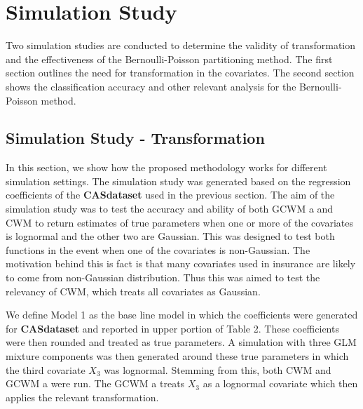 \documentclass[11pt,letterpaper]{article}
\numberwithin{equation}{section}
\numberwithin{equation}{section}
\numberwithin{equation}{section}
\begin{document}

\section{Simulation Study}

Two simulation studies are conducted to determine the validity of transformation and the effectiveness of the Bernoulli-Poisson partitioning method. The first section outlines the need for transformation in the covariates. The second section shows the classification accuracy and other relevant analysis for the Bernoulli-Poisson method.


\subsection{Simulation Study - Transformation}


In this section, we show how the proposed methodology works for different simulation settings. The simulation study was generated based on the regression coefficients of the \textbf{CASdataset} used in the previous section. The aim of the simulation study was to test the accuracy and ability of both GCWM a and CWM to return estimates of true parameters when one or more of the covariates is lognormal and the other two are Gaussian. This was designed to test both functions in the event when one of the covariates is non-Gaussian. The motivation behind this is fact is that many covariates used in insurance are likely to come from non-Gaussian distribution. Thus this was aimed to test the relevancy of CWM, which treats all covariates as Gaussian.

We define Model 1 as the base line model in which the coefficients were generated for \textbf{CASdataset} and reported in upper portion of Table 2. These coefficients were then rounded and treated as true parameters. A simulation with three GLM mixture components was then generated around these true parameters in which the third covariate $X_3$ was lognormal. Stemming from this, both CWM and  GCWM a were run. The  GCWM a treats $X_3$ as a lognormal covariate which then applies the relevant transformation.
\end{document}
